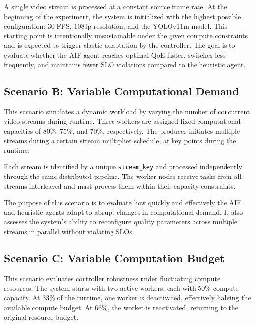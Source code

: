 A single video stream is processed at a constant source frame rate. At the beginning of the experiment, the system is initialized with the highest possible configuration: 30 FPS, 1080p resolution, and the YOLOv11m model. This starting point is intentionally unsustainable under the given compute constraints and is expected to trigger elastic adaptation by the controller. The goal is to evaluate whether the AIF agent reaches optimal QoE faster, switches less frequently, and maintains fewer SLO violations compared to the heuristic agent.

\subsection{Scenario B: Variable Computational Demand}
\label{sec:evaluation-variable-demand}

This scenario simulates a dynamic workload by varying the number of concurrent video streams during runtime. Three workers are assigned fixed computational capacities of 80\%, 75\%, and 70\%, respectively. The producer initiates multiple streams during a certain stream multiplier schedule, at key points during the runtime:



Each stream is identified by a unique \texttt{stream\_key} and processed independently through the same distributed pipeline. The worker nodes receive tasks from all streams interleaved and must process them within their capacity constraints.

The purpose of this scenario is to evaluate how quickly and effectively the AIF and heuristic agents adapt to abrupt changes in computational demand. It also assesses the system’s ability to reconfigure quality parameters across multiple streams in parallel without violating SLOs.

\subsection{Scenario C: Variable Computation Budget}
\label{sec:evaluation-variable-budget}

This scenario evaluates controller robustness under fluctuating compute resources. The system starts with two active workers, each with 50\% compute capacity. At 33\% of the runtime, one worker is deactivated, effectively halving the available compute budget. At 66\%, the worker is reactivated, returning to the original resource budget.

